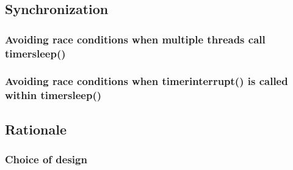 \documentclass{article}
\renewcommand{\_}{\char`_}
\begin{document}
\subsection{Synchronization}
\subsubsection{Avoiding race conditions when multiple threads call timer\textunderscore sleep()}
\subsubsection{Avoiding race conditions when timer\textunderscore interrupt() is called within timer\textunderscore sleep()}
\subsection{Rationale}
\subsubsection{Choice of design}



\end{document}
